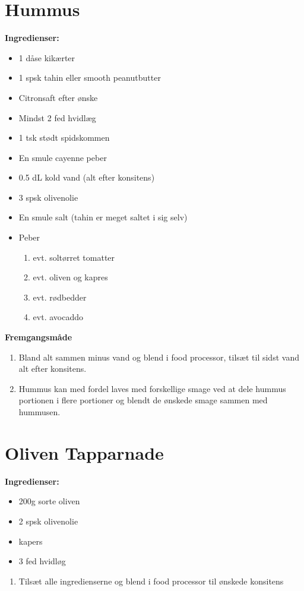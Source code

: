 \documentclass{book}
\begin{document}
{\section{Hummus}
\begin{minipage}[t]{0.5\textwidth}
\textbf{Ingredienser:}
\begin{itemize}
    \item 1 dåse kikærter
    \item 1 spsk tahin eller smooth peanutbutter
    \item Citronsaft efter ønske
    \item Mindst 2 fed hvidlæg
    \item 1 tsk stødt spidskommen
    \item En smule cayenne peber
    \item 0.5 dL kold vand (alt efter konsitens)
    \item 3 spsk olivenolie
    \item En smule salt (tahin er meget saltet i sig selv)
    \item Peber
    \begin{enumerate}
        \item evt. soltørret tomatter
        \item evt. oliven og kapres
        \item evt. rødbedder
        \item evt. avocaddo
    \end{enumerate}
\end{itemize}
\end{minipage}
\begin{minipage}[t]{0.5\textwidth}
\textbf{Fremgangsmåde}
\begin{enumerate}
    \item Bland alt sammen minus vand og blend i food processor, tilsæt til sidst vand alt efter konsitens.
    \item Hummus kan med fordel laves med forskellige smage ved at dele hummus portionen i flere portioner og blendt de ønskede smage sammen med hummusen.  
\end{enumerate}
\end{minipage}
\section{Oliven Tapparnade}
\begin{minipage}[t]{0.5\textwidth}
\textbf{Ingredienser:}
\begin{itemize}
    \item 200g sorte oliven
    \item 2 spsk olivenolie
    \item kapers
    \item 3 fed hvidløg
\end{itemize}
\end{minipage}
\begin{minipage}[t]{0.5\textwidth}
\begin{enumerate}
    \item Tilsæt alle ingredienserne og blend i food processor til ønskede konsitens
\end{enumerate}
\end{minipage}
}
\end{document}
